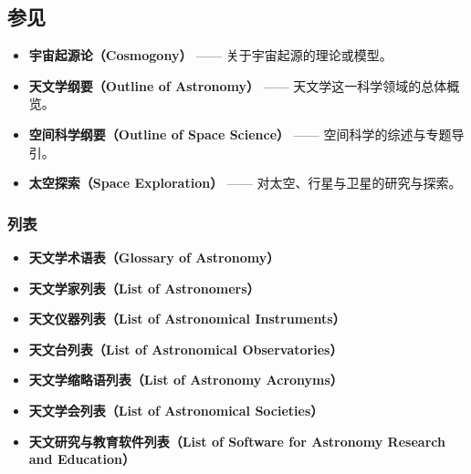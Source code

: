 \subsection{参见}
\begin{itemize}
  \item \textbf{宇宙起源论（Cosmogony）} —— 关于宇宙起源的理论或模型。
  \item \textbf{天文学纲要（Outline of Astronomy）} —— 天文学这一科学领域的总体概览。
  \item \textbf{空间科学纲要（Outline of Space Science）} —— 空间科学的综述与专题导引。
  \item \textbf{太空探索（Space Exploration）} —— 对太空、行星与卫星的研究与探索。
\end{itemize}
\subsubsection{列表}
\begin{itemize}
  \item \textbf{天文学术语表（Glossary of Astronomy）}
  \item \textbf{天文学家列表（List of Astronomers）}
  \item \textbf{天文仪器列表（List of Astronomical Instruments）}
  \item \textbf{天文台列表（List of Astronomical Observatories）}
  \item \textbf{天文学缩略语列表（List of Astronomy Acronyms）}
  \item \textbf{天文学会列表（List of Astronomical Societies）}
  \item \textbf{天文研究与教育软件列表（List of Software for Astronomy Research and Education）}
\end{itemize}

